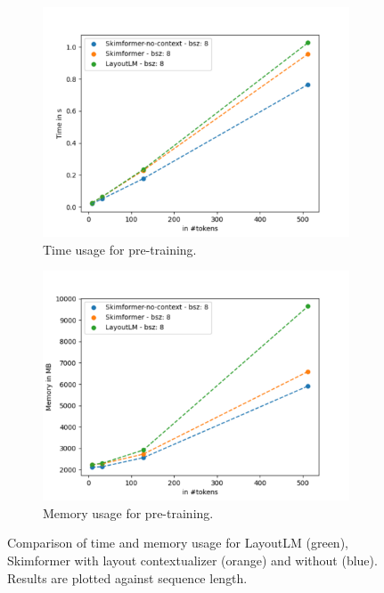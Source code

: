 \begin{figure}[!htbp]
\centering
\small
  \begin{subfigure}[b]{0.49\textwidth}
    \includegraphics[width=\textwidth]{images/chapter3/train_time_plot.pdf}
    \caption{Time usage for pre-training.}
    \label{fig:benchmark-train-time}
  \end{subfigure}
  \begin{subfigure}[b]{0.49\textwidth}
    \includegraphics[width=\textwidth]{images/chapter3/train_required_memory_plot.pdf}
    \caption{Memory usage for pre-training.}
    \label{fig:benchmark-train-memory}
  \end{subfigure}
  \caption{Comparison of time and memory usage for LayoutLM (green), Skimformer with layout contextualizer (orange) and without (blue). Results are plotted against sequence length.}
  \label{fig:benchmark}
\end{figure}

